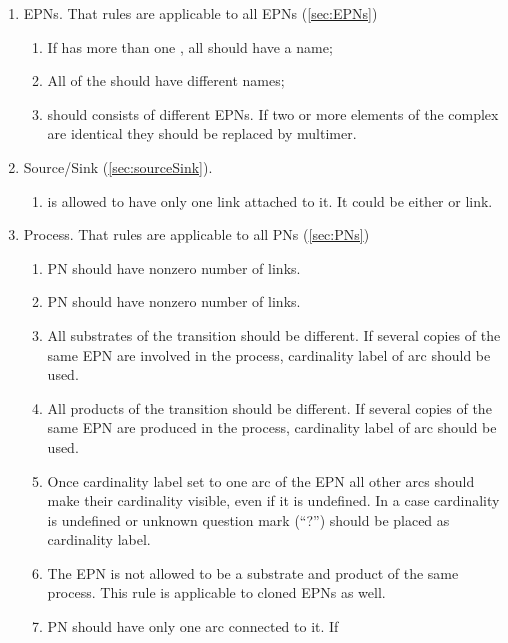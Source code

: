 \begin{enumerate}
  \item EPNs. That rules are applicable to all EPNs (\ref{sec:EPNs})
  \begin{enumerate}
    \item If  has more than one , 
    all  should have a name;
    \item All  of the  should have 
    different names;
    \item {} should consists of different EPNs. If two or more 
    elements of the complex are identical they should be replaced by multimer. 
  \end{enumerate}
  \item Source/Sink (\ref{sec:sourceSink}).
  \begin{enumerate}
    \item {} is allowed to have only one link attached to it. It
    could be either  or  link.
  \end{enumerate}
    \item Process. That rules are applicable to all PNs (\ref{sec:PNs})
  \begin{enumerate}
    \item PN should have nonzero number of  links.
    \item PN should have nonzero number of  links.
    \item All substrates of the transition should be different. If several 
    copies of the same EPN are involved in the process, cardinality label of 
     arc should be used.
    \item All products of the transition should be different. If several copies 
    of the same EPN are produced in the process, cardinality label of 
     arc should be used.
    \item Once cardinality label set to one arc of the EPN all other arcs should
    make their cardinality visible, even if it is undefined. In a case
    cardinality is undefined or unknown question mark (``?'') should be placed as cardinality label. 
    \item The EPN is not allowed to be a substrate and product of the same 
    process. This rule is applicable to cloned EPNs as well.
    \item PN should have only one  arc connected to it. If

\end{enumerate}
\end{enumerate}
